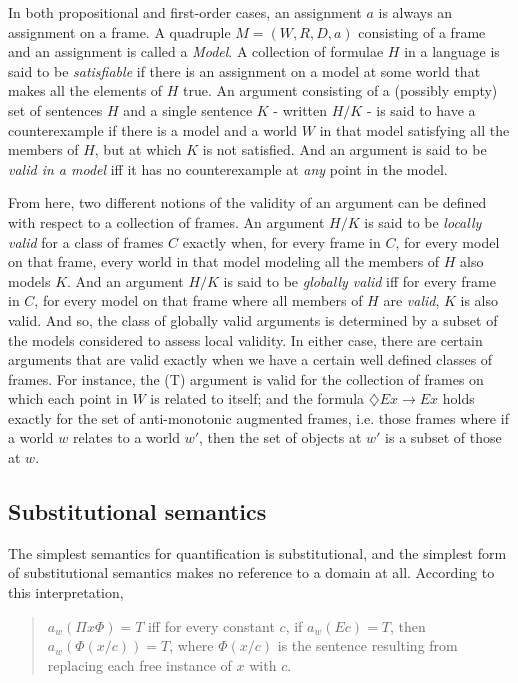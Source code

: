 \documentclass[]{article}
\begin{document}
In both propositional and first-order cases, an assignment $a$ is always an assignment on a frame. A quadruple $M = (W, R, D, a)$ consisting of a frame and an assignment is called a \textit{Model}. A collection of formulae $H$ in a language is said to be \textit{satisfiable} if there is an assignment on a model at some world that makes all the elements of $H$ true. An argument consisting of a (possibly empty) set of sentences $H$ and a single sentence $K$ - written $H / K$ - is said to have a counterexample if there is a model and a world $W$ in that model satisfying all the members of $H$, but at which $K$ is not satisfied. And an argument is said to be \textit{valid in a model} iff it has no counterexample at \textit{any} point in the model.

From here, two different notions of the validity of an argument can be defined with respect to a collection of frames. An argument $H / K$ is said to be \textit{locally valid} for a class of frames $C$ exactly when, for every frame in $C$, for every model on that frame, every world in that model modeling all the members of $H$ also models $K$. And an argument $H / K$ is said to be \textit{globally valid} iff for every frame in $C$, for every model on that frame where all members of $H$ are \textit{valid}, $K$ is also valid. And so, the class of globally valid arguments is determined by a subset of the models considered to assess local validity. In either case, there are certain arguments that are valid exactly when we have a certain well defined classes of frames. For instance, the (T) argument is valid for the collection of frames on which each point in $W$ is related to itself; and the formula $\diamondsuit Ex \rightarrow Ex$ holds exactly for the set of anti-monotonic augmented frames, i.e. those frames where if a world $w$ relates to a world $w'$, then the set of objects at $w'$ is a subset of those at $w$.

\subsection{Substitutional semantics}
The simplest semantics for quantification is substitutional, and the simplest form of substitutional semantics makes no reference to a domain at all. According to this interpretation,

\begin{quote}
$a_{w}(\Pi x \Phi) = T$ iff for every constant $c$, if $a_{w}(Ec) = T$, then $a_{w}(\Phi(x/c)) = T$, where $\Phi(x/c)$ is the sentence resulting from replacing each free instance of $x$ with $c$.
\end{quote}
\end{document}
